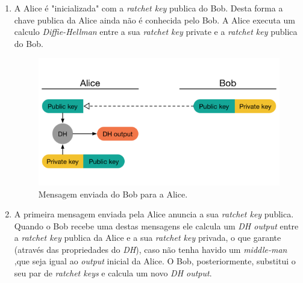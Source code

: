 \begin{enumerate}
    \item A Alice é "inicializada" com a \textit{ratchet key} publica do Bob. Desta forma a chave publica da Alice ainda não é conhecida pelo Bob. A Alice executa um calculo \textit{Diffie-Hellman} entre a sua \textit{ratchet key} private e a \textit{ratchet key} publica do Bob.

    \begin{figure}[H]
        \begin{center}
            \includegraphics[width=12cm]{img/DH1.png}
            \caption{Mensagem enviada do Bob para a Alice.}
            \label{diagram:DH1}
        \end{center}
    \end{figure}

    \item A primeira mensagem enviada pela Alice anuncia a sua \textit{ratchet key} publica. Quando o Bob recebe uma destas mensagens ele calcula um \textit{DH output} entre a \textit{ratchet key} publica da Alice e a sua \textit{ratchet key} privada, o que garante (através das propriedades do \textit{DH}), caso não tenha havido um \textit{middle-man} ,que seja igual ao \textit{output} inicial da Alice. O Bob, posteriormente, substitui o seu par de \textit{ratchet keys} e calcula um novo \textit{DH output}.


\end{enumerate}
